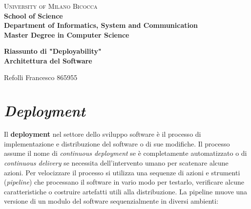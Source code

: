 \documentclass[a4paper,11pt,oneside, table]{article}
\begin{document}
  \noindent
  \begin{minipage}[t]{0.19\textwidth}
  \end{minipage}
  \begin{minipage}[t]{0.81\textwidth}
    {
      {\textsc{University of Milano Bicocca}} \\
      \textbf{School of Science} \\
      \textbf{Department of Informatics, System and Communication} \\
      \textbf{Master Degree in Computer Science} \\
      \par
    }
  \end{minipage}
  \begin{center}
    {\LARGE{
      \textbf{Riassunto di "Deployability"} \\
      \textbf{Architettura del Software}
      \par
    }}
  \end{center}
  \begin{center}
    \large{Refolli Francesco} \large{865955}
  \end{center}

  \renewcommand{\baselinestretch}{1.5}

  \section{\textit{Deployment}}

  Il \textbf{deployment} nel settore dello sviluppo software \`e il processo di implementazione e distribuzione del software o di sue modifiche. Il processo assume il nome di \textit{continuous deployment} se \`e completamente automatizzato o di \textit{continuous delivery} se necessita dell'intervento umano per scatenare alcune azioni. Per velocizzare il processo si utilizza una sequenze di azioni e strumenti (\textit{pipeline}) che processano il software in vario modo per testarlo, verificare alcune caratteristiche o costruire artefatti utili alla distribuzione. La pipeline muove una versione di un modulo del software sequenzialmente in diversi ambienti:
\end{document}
